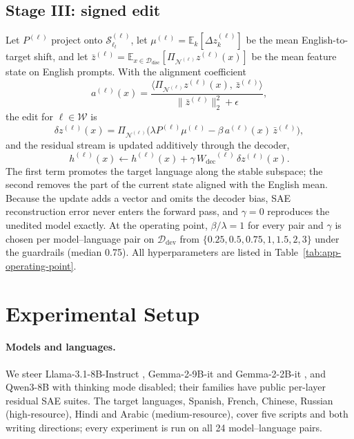 \documentclass[11pt]{article}
\newcommand{\Ddev}{\ensuremath{\mathcal{D}_{\mathrm{dev}}}\xspace}
\newcommand{\Ddisc}{\ensuremath{\mathcal{D}_{\mathrm{disc}}}\xspace}
\newcommand{\Wdec}{\ensuremath{W_{\mathrm{dec}}}}
\begin{document}
\subsection{Stage III: signed edit}
\label{subsec:stage3}

Let $P^{(\ell)}$ project onto $\mathcal{S}^{(\ell)}_{\ell_t}$, let $\mu^{(\ell)}=\mathbb{E}_k[\Delta z^{(\ell)}_k]$ be the mean English-to-target shift, and let $\bar{z}^{(\ell)}=\mathbb{E}_{x\in\Ddisc}[\Pi_{\mathcal{N}^{(\ell)}}z^{(\ell)}(x)]$ be the mean feature state on English prompts. With the alignment coefficient
\begin{equation}
a^{(\ell)}(x)=\frac{\langle \Pi_{\mathcal{N}^{(\ell)}}z^{(\ell)}(x),\,\bar z^{(\ell)}\rangle}{\|\bar z^{(\ell)}\|_2^2+\epsilon},
\end{equation}
the edit for $\ell\in\mathcal{W}$ is
\begin{equation}
\delta z^{(\ell)}(x)=\Pi_{\mathcal{N}^{(\ell)}}\big(\lambda P^{(\ell)}\mu^{(\ell)}-\beta\,a^{(\ell)}(x)\,\bar z^{(\ell)}\big),
\label{eq:edit}
\end{equation}
and the residual stream is updated additively through the decoder,
\begin{equation}
h^{(\ell)}(x)\leftarrow h^{(\ell)}(x)+\gamma\,\Wdec^{(\ell)}\,\delta z^{(\ell)}(x).
\label{eq:update}
\end{equation}
The first term promotes the target language along the stable subspace; the second removes the part of the current state aligned with the English mean. Because the update adds a vector and omits the decoder bias, SAE reconstruction error never enters the forward pass, and $\gamma=0$ reproduces the unedited model exactly. At the operating point, $\beta/\lambda=1$ for every pair and $\gamma$ is chosen per model--language pair on \Ddev from $\{0.25,0.5,0.75,1,1.5,2,3\}$ under the guardrails (median 0.75). All hyperparameters are listed in Table~\ref{tab:app-operating-point}.

\section{Experimental Setup}
\label{sec:setup}

\paragraph{Models and languages.}
We steer Llama-3.1-8B-Instruct \citep{grattafiori2024llama3herdmodels}, Gemma-2-9B-it and Gemma-2-2B-it \citep{gemma2024gemma2}, and Qwen3-8B \citep{yang2025qwen3} with thinking mode disabled; their families have public per-layer residual SAE suites. The target languages, Spanish, French, Chinese, Russian (high-resource), Hindi and Arabic (medium-resource), cover five scripts and both writing directions; every experiment is run on all 24 model--language pairs.
\end{document}
